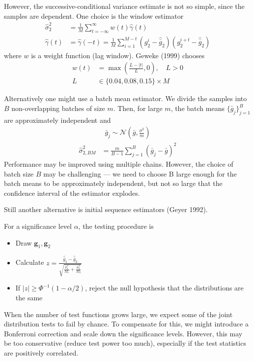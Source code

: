\documentclass{article}
\begin{document}
However, the successive-conditional variance estimate is not so simple, since the samples are dependent. One choice is the window estimator
\begin{align*}
    \hat{\sigma}_{2}^{2} &= \frac{1}{M}\sum_{t=-\infty}^{\infty} w(t) \hat{\gamma}(t) \\
    \hat{\gamma}(t) &= \hat{\gamma}(-t) = \frac{1}{M}\sum_{i=1}^{M-t}(g_{2}^{i} - \hat{\bar{g}}_{2})(g_{2}^{i+t} - \hat{\bar{g}}_{2})
\end{align*}
where $w$ is a weight function (lag window). Geweke (1999) chooses
\begin{align*}
    w(t) &= \max{\left(\frac{L-|t|}{L}, 0\right)}, \quad L > 0 \\
    L &\in \{0.04, 0.08, 0.15\} \times M
\end{align*}

Alternatively one might use a batch mean estimator. We divide the samples into $B$ non-overlapping batches of size $m$. Then, for large $m$, the batch means $\{\bar{g}_{j}\}_{j=1}^{B}$ are approximately independent and
\begin{align*}
    \bar{g}_{j} \sim \mathcal{N}(\bar{g}, \frac{\sigma^{2}}{m})
\end{align*}
\begin{align*}
    \hat{\sigma}_{2, BM}^{2} &= \frac{m}{B-1}\sum_{j=1}^{B} (\bar{g}_{j} - \bar{g})^{2}
\end{align*}
Performance may be improved using multiple chains. However, the choice of batch size $B$ may be challenging --- we need to choose B large enough for the batch means to be approximately independent, but not so large that the confidence interval of the estimator explodes.

Still another alternative is initial sequence estimators (Geyer 1992).

For a significance level $\alpha$, the testing procedure is
\begin{itemize}
    \item Draw $\mathbf{g}_{1}, \mathbf{g}_{2}$
    \item Calculate $z=\frac{\hat{\bar{g}}_{1} - \hat{\bar{g}}_{2}}{\sqrt{ \frac{\hat{\sigma}^{2}_{1}}{M_{1}} + \frac{\hat{\sigma}^{2}_{2}}{M_{2}}}}$
    \item If $|z| \geq \Phi^{-1}(1-\alpha/2)$, reject the null hypothesis that the distributions are the same
\end{itemize}

When the number of test functions grows large, we expect some of the joint distribution tests to fail by chance. To compensate for this, we might introduce a Bonferroni correction and scale down the significance levels. However, this may be too conservative (reduce test power too much), especially if the test statistics are positively correlated. 
\end{document}
